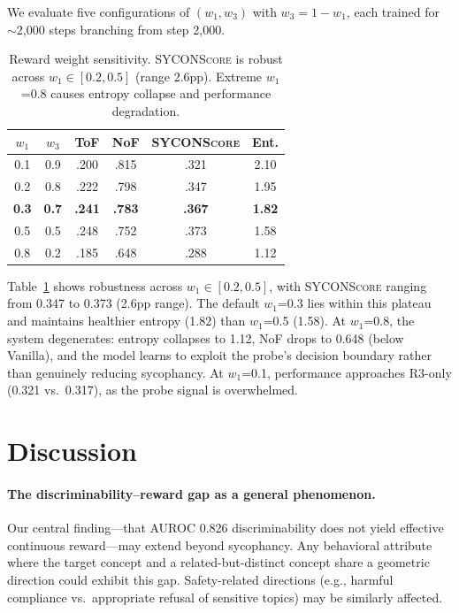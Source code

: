 \documentclass[11pt,a4paper]{article}
\newcommand{\sycon}{\textsc{SYCONScore}}
\begin{document}
We evaluate five configurations of $(w_1, w_3)$ with $w_3 = 1 - w_1$, each trained for $\sim$2{,}000 steps branching from step 2{,}000.

\begin{table}[t]
\centering
\small
\begin{tabular}{@{}cccccc@{}}
\toprule
$w_1$ & $w_3$ & ToF & NoF & \sycon{} & Ent. \\
\midrule
0.1 & 0.9 & .200 & .815 & .321 & 2.10 \\
0.2 & 0.8 & .222 & .798 & .347 & 1.95 \\
\textbf{0.3} & \textbf{0.7} & \textbf{.241} & \textbf{.783} & \textbf{.367} & \textbf{1.82} \\
0.5 & 0.5 & .248 & .752 & .373 & 1.58 \\
0.8 & 0.2 & .185 & .648 & .288 & 1.12 \\
\bottomrule
\end{tabular}
\caption{Reward weight sensitivity. \sycon{} is robust across $w_1 \in [0.2, 0.5]$ (range 2.6pp). Extreme $w_1$=0.8 causes entropy collapse and performance degradation.}
\label{tab:weights}
\end{table}

Table~\ref{tab:weights} shows robustness across $w_1 \in [0.2, 0.5]$, with \sycon{} ranging from 0.347 to 0.373 (2.6pp range). The default $w_1$=0.3 lies within this plateau and maintains healthier entropy (1.82) than $w_1$=0.5 (1.58). At $w_1$=0.8, the system degenerates: entropy collapses to 1.12, NoF drops to 0.648 (below Vanilla), and the model learns to exploit the probe's decision boundary rather than genuinely reducing sycophancy. At $w_1$=0.1, performance approaches R3-only (0.321 vs.\ 0.317), as the probe signal is overwhelmed.


\section{Discussion}

\paragraph{The discriminability--reward gap as a general phenomenon.} Our central finding---that AUROC 0.826 discriminability does not yield effective continuous reward---may extend beyond sycophancy. Any behavioral attribute where the target concept and a related-but-distinct concept share a geometric direction could exhibit this gap. Safety-related directions (e.g., harmful compliance vs.\ appropriate refusal of sensitive topics) may be similarly affected.
\end{document}
